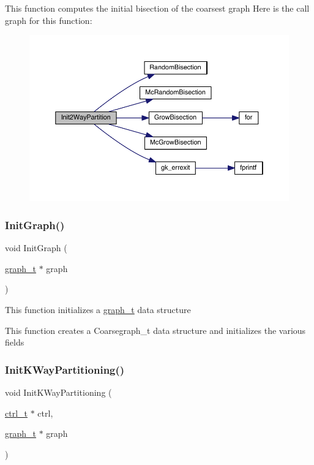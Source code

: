 This function computes the initial bisection of the coarsest graph Here is the call graph for this function\+:\nopagebreak
\begin{figure}[H]
\begin{center}
\leavevmode
\includegraphics[width=350pt]{a00945_af566aa1abb139c5b46b29c95b9ed075d_cgraph}
\end{center}
\end{figure}
\mbox{\label{a00945_af046766ada304a0cf49db44b544810a8}} 
\subsubsection{\texorpdfstring{Init\+Graph()}{InitGraph()}}
{\footnotesize\ttfamily void Init\+Graph (\begin{DoxyParamCaption}\item[{\hyperlink{a00734}{graph\+\_\+t} $\ast$}]{graph }\end{DoxyParamCaption})}

This function initializes a \hyperlink{a00734}{graph\+\_\+t} data structure

This function creates a Coarsegraph\+\_\+t data structure and initializes the various fields \mbox{\label{a00945_a870e37cc14eb1033c62d83d3a7c33a91}} 
\subsubsection{\texorpdfstring{Init\+K\+Way\+Partitioning()}{InitKWayPartitioning()}}
{\footnotesize\ttfamily void Init\+K\+Way\+Partitioning (\begin{DoxyParamCaption}\item[{\hyperlink{a00742}{ctrl\+\_\+t} $\ast$}]{ctrl,  }\item[{\hyperlink{a00734}{graph\+\_\+t} $\ast$}]{graph }\end{DoxyParamCaption})}

